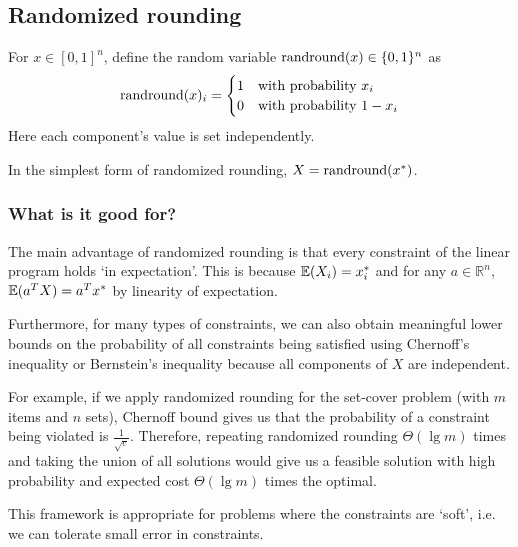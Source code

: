 \subsection{Randomized rounding}

For $x \in [0, 1]^n$, define the random variable $\operatorname{randround}(x) \in \{0, 1\}^n$ as
\[ \operatorname{randround}(x)_i = \begin{cases} 1 & \textrm{with probability } x_i \\
0 & \textrm{with probability } 1-x_i \end{cases} \]
Here each component's value is set independently.

In the simplest form of randomized rounding, $X = \operatorname{randround}(x^*)$.

\subsubsection{What is it good for?}

The main advantage of randomized rounding is that every constraint
of the linear program holds `in expectation'.
This is because $\operatorname{\mathbb{E}}(X_i) = x^*_i$ and for any $a \in \mathbb{R}^n$,
$\operatorname{\mathbb{E}}(a^TX) = a^Tx^*$ by linearity of expectation.

Furthermore, for many types of constraints, we can also obtain
meaningful lower bounds on the probability of all constraints being satisfied
using Chernoff's inequality or Bernstein's inequality
because all components of $X$ are independent.

For example, if we apply randomized rounding for the set-cover problem
(with $m$ items and $n$ sets),
Chernoff bound gives us that the probability of a constraint
being violated is $\frac{1}{\sqrt{e}}$.
Therefore, repeating randomized rounding
$\Theta(\lg m)$ times and taking the union of all solutions
would give us a feasible solution with high probability
and expected cost $\Theta(\lg m)$ times the optimal.

This framework is appropriate for problems where the constraints are `soft',
i.e. we can tolerate small error in constraints.
